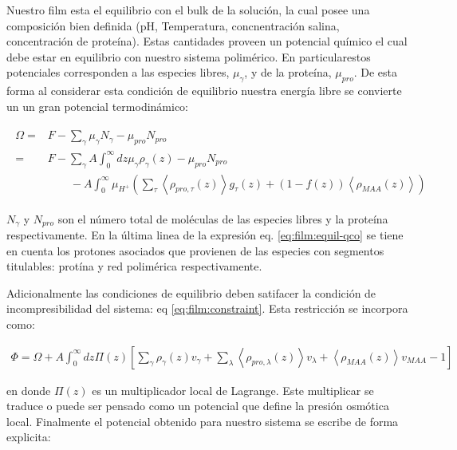 Nuestro film esta el equilibrio con el bulk de la soluci\'on, la cual posee una composici\'on bien definida (pH, Temperatura, concnentraci\'on salina,  concentraci\'on de prote\'ina). Estas cantidades proveen un potencial qu\'imico el cual debe estar en equilibrio con nuestro sistema polim\'erico. En particularestos potenciales corresponden a las especies libres, $\mu_\gamma$, y de la prote\'ina, $\mu_{pro}$.
De esta forma al considerar esta condici\'on de equilibrio nuestra energ\'ia libre se convierte un un gran potencial termodin\'amico:

\begin{align}
	\begin{aligned}
		\Omega = &F - \sum_\gamma \mu_\gamma N_\gamma -  \mu_{pro} N_{pro} \\
			= &F -\sum_\gamma A\int_0^\infty dz \mu_\gamma \rho_\gamma(z) -  \mu_{pro} N_{pro}  \\
			& \qquad -A\int_0^\infty \mu_{H^+} \left( \sum_\tau\left< \rho_{pro,\tau}(z) \right>g_\tau(z) + (1-f(z))\left< \rho_{MAA}(z) \right> \right )
			\end{aligned}
		\label{eq:film:equil-qco}
\end{align}

\noindent $N_\gamma$ y $ N_{pro}$ son el n\'umero total de mol\'eculas de las especies libres y la prote\'ina respectivamente. En la \'ultima linea de la expresi\'on eq. \ref{eq:film:equil-qco} se tiene en cuenta los protones asociados que  provienen de las especies con segmentos titulables: prot\'ina y red polim\'erica respectivamente.


Adicionalmente las condiciones de equilibrio deben satifacer la condici\'on de incompresibilidad del sistema: eq \ref{eq:film:constraint}.  Esta restricci\'on se incorpora como:

\begin{align}
	\Phi = \Omega +A \int_0^\infty dz\Pi(z){\left[\sum_{\gamma}\rho_\gamma(z) v_\gamma + \sum_\lambda{\left<\rho_{pro,\lambda}(z)\right>v_\lambda} + \left<\rho_{MAA}(z)\right>v_{MAA} -1 \right]}
\end{align}


\noindent en donde $\Pi(z)$ es un multiplicador local de Lagrange.  Este multiplicar se traduce o puede ser pensado como un potencial que define la presi\'on osm\'otica local. Finalmente el potencial obtenido para nuestro sistema se escribe de forma explicita:
 
